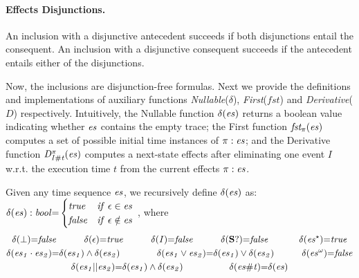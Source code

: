 \documentclass[acmsmall,10pt,review]{acmart}
\newcommand{\es}{\textcolor{black}{\ensuremath{{es}}}}
\newcommand\pure[1]{ \textcolor{black}{#1}}
\newcommand{\seq}{\cdot}
\newcommand{\choice}{\vee}
\newcommand{\code}[1]{{\tt{\ensuremath{\m{#1}}}}}
\newcommand{\esn}[2]{\ensuremath{#1^{#2}}}
\newcommand{\empt}{\textcolor{black}{\ensuremath{\epsilon}}}
\newcommand{\bott}{\textcolor{black}{\ensuremath{\bot}}}
\newcommand{\m}{\mathit}
\begin{document}
{\paragraph{\textbf{Effects Disjunctions.}}
An inclusion with a disjunctive antecedent succeeds if both disjunctions entail the consequent.  An inclusion with a disjunctive consequent succeeds if the antecedent entails either of the disjunctions.  
{ 

}

Now, the inclusions are disjunction-free formulas. 
Next we provide the definitions and implementations of auxiliary functions \emph{Nullable}(\code{\delta}), \emph{First}(\code{fst}) and \emph{Derivative}(\code{D}) respectively.
Intuitively, the Nullable function \code{\delta(\es)} returns a boolean value indicating whether \code{\es} contains the empty trace; the First function \code{fst_{\pure{\pi}}( \es)} computes a set of possible initial time instances of \code{\pure{\pi} : \es}; and the Derivative function \code{D_{I\# t}^{\pure{\pi}}(\es)} computes a next-state effects after eliminating one event \code{I} w.r.t. the execution time \code{t} from the current effects \code{\pure{\pi} : \es}. 



%




\begin{definition}[Nullable]\label{Nullable}
Given any time sequence \code{\es}, we recursively define \code{\delta(\es)} as:\\
{
\code{\delta(\es) :bool {=}
\begin{cases}
      \code{true} & \code{if\ \empt \in \es}\\
      \code{false} & \code{if\ \empt \notin \es}
    \end{cases} }
    }, where   
{ 
\begin{gather*}
\code{\delta(\bott) {=} false} 
\qquad\quad
\code{\delta(\empt) {=} true} 
\qquad\quad
\code{\delta(I){=} false}   
\qquad\quad
\code{\delta(\textbf{S}?){=} false}   
\qquad\quad\
    \code{\delta(\esn{\es}{\star} ) {=} true}   
\\ 
\code{\delta(\es_1 \seq \es_2) {=} \delta(\es_1) \wedge \delta(\es_2)}
\qquad\qquad
  \code{\delta(\es_1 \choice \es_2) {=} \delta(\es_1) \vee \delta(\es_2)}   
  \qquad\quad
  \code{\delta(\esn{\es}{\omega} ) {=} false}     
  \\
\code{\delta(\es_1 || \es_2) {=} \delta(\es_1) \wedge \delta(\es_2)}
\qquad\qquad\quad
 \code{\delta(\es \# t) {=} \delta(\es)}
\end{gather*}}
\end{definition}

}
\end{document}
